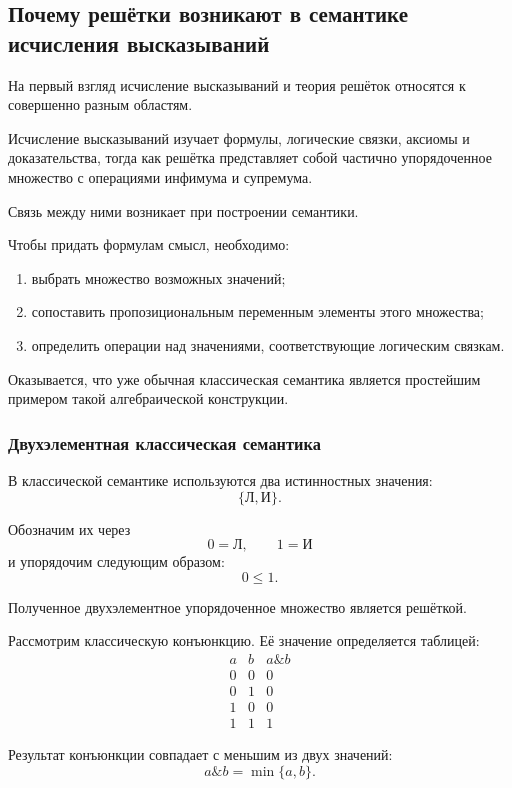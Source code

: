 \documentclass[12pt,a4paper,oneside,openany]{book}
\theoremstyle{definition}
\theoremstyle{plain}
\theoremstyle{remark}
\begin{document}
\subsection{Почему решётки возникают в семантике исчисления высказываний}

На первый взгляд исчисление высказываний и теория решёток относятся
к совершенно разным областям.

Исчисление высказываний изучает формулы, логические связки, аксиомы
и доказательства, тогда как решётка представляет собой частично
упорядоченное множество с операциями инфимума и супремума.

Связь между ними возникает при построении семантики.

Чтобы придать формулам смысл, необходимо:

\begin{enumerate}
    \item выбрать множество возможных значений;
    \item сопоставить пропозициональным переменным элементы этого
          множества;
    \item определить операции над значениями, соответствующие
          логическим связкам.
\end{enumerate}

Оказывается, что уже обычная классическая семантика является
простейшим примером такой алгебраической конструкции.

\subsubsection{Двухэлементная классическая семантика}

В классической семантике используются два истинностных значения:
\[
\{\text{Л},\text{И}\}.
\]

Обозначим их через
\[
0=\text{Л},
\qquad
1=\text{И}
\]
и упорядочим следующим образом:
\[
0\leq1.
\]

Полученное двухэлементное упорядоченное множество является решёткой.

Рассмотрим классическую конъюнкцию. Её значение определяется таблицей:
\[
\begin{array}{c|c|c}
a&b&a\mathbin{\&}b\\
\hline
0&0&0\\
0&1&0\\
1&0&0\\
1&1&1
\end{array}
\]

Результат конъюнкции совпадает с меньшим из двух значений:
\[
a\mathbin{\&}b
=
\min\{a,b\}.
\]
\end{document}
